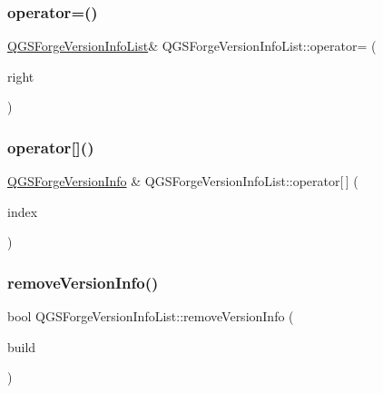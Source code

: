 \subsubsection{\texorpdfstring{operator=()}{operator=()}\hspace{0.1cm}{\footnotesize\ttfamily [2/2]}}
{\footnotesize\ttfamily \mbox{\hyperlink{class_q_g_s_forge_version_info_list}{Q\+G\+S\+Forge\+Version\+Info\+List}}\& Q\+G\+S\+Forge\+Version\+Info\+List\+::operator= (\begin{DoxyParamCaption}\item[{\mbox{\hyperlink{class_q_g_s_forge_version_info_list}{Q\+G\+S\+Forge\+Version\+Info\+List}} \&\&}]{right }\end{DoxyParamCaption})\hspace{0.3cm}{\ttfamily [default]}}

\mbox{\label{class_q_g_s_forge_version_info_list_a1faecfc10e24abe75474fa13132c0bbc}} 
\subsubsection{\texorpdfstring{operator[]()}{operator[]()}}
{\footnotesize\ttfamily \mbox{\hyperlink{class_q_g_s_forge_version_info}{Q\+G\+S\+Forge\+Version\+Info}} \& Q\+G\+S\+Forge\+Version\+Info\+List\+::operator\mbox{[}$\,$\mbox{]} (\begin{DoxyParamCaption}\item[{const int}]{index }\end{DoxyParamCaption})}

\mbox{\label{class_q_g_s_forge_version_info_list_a7ca396dad424121abd1c003a51cc698c}} 
\subsubsection{\texorpdfstring{remove\+Version\+Info()}{removeVersionInfo()}}
{\footnotesize\ttfamily bool Q\+G\+S\+Forge\+Version\+Info\+List\+::remove\+Version\+Info (\begin{DoxyParamCaption}\item[{const int}]{build }\end{DoxyParamCaption})}

